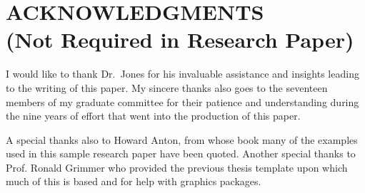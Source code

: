 


\chapter*{ACKNOWLEDGMENTS\\
\small (Not Required in Research Paper)}

I would like to thank Dr.\ Jones for his invaluable assistance and
insights leading to the writing of this paper.  My sincere thanks
also goes to the seventeen members of my graduate committee for their
patience and understanding during the nine years of effort that
went into the production of this paper.


A special thanks also to Howard Anton, from whose
book many of the examples used in this sample research paper have
been quoted. Another special thanks to Prof. Ronald Grimmer who
provided the previous thesis template upon which much of this is
based and for help with graphics packages.

\newpage

